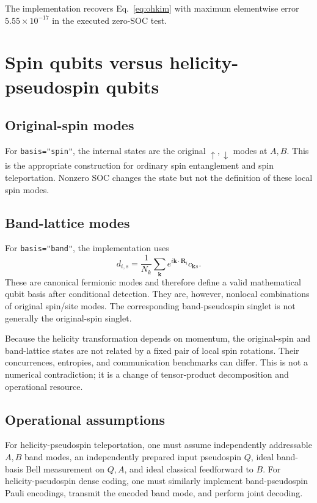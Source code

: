 \documentclass[11pt]{article}
\newcommand{\kb}{\mathbf k}
\begin{document}
The implementation recovers Eq.~\eqref{eq:ohkim} with maximum elementwise error $5.55\times10^{-17}$ in the executed zero-SOC test.

\section{Spin qubits versus helicity-pseudospin qubits}
\label{sec:qubits}

\subsection{Original-spin modes}

For \verb|basis="spin"|, the internal states are the original $\uparrow,\downarrow$ modes at $A,B$. This is the appropriate construction for ordinary spin entanglement and spin teleportation. Nonzero SOC changes the state but not the definition of these local spin modes.

\subsection{Band-lattice modes}

For \verb|basis="band"|, the implementation uses
\begin{equation}
d_{i,s}=\frac1{N_k}\sum_{\kb}e^{i\kb\cdot\mathbf R_i}c_{\kb s}.
\label{eq:band_modes}
\end{equation}
These are canonical fermionic modes and therefore define a valid mathematical qubit basis after conditional detection. They are, however, nonlocal combinations of original spin/site modes. The corresponding band-pseudospin singlet is not generally the original-spin singlet.

Because the helicity transformation depends on momentum, the original-spin and band-lattice states are not related by a fixed pair of local spin rotations. Their concurrences, entropies, and communication benchmarks can differ. This is not a numerical contradiction; it is a change of tensor-product decomposition and operational resource.

\subsection{Operational assumptions}

For helicity-pseudospin teleportation, one must assume independently addressable $A,B$ band modes, an independently prepared input pseudospin $Q$, ideal band-basis Bell measurement on $Q,A$, and ideal classical feedforward to $B$. For helicity-pseudospin dense coding, one must similarly implement band-pseudospin Pauli encodings, transmit the encoded band mode, and perform joint decoding.
\end{document}
